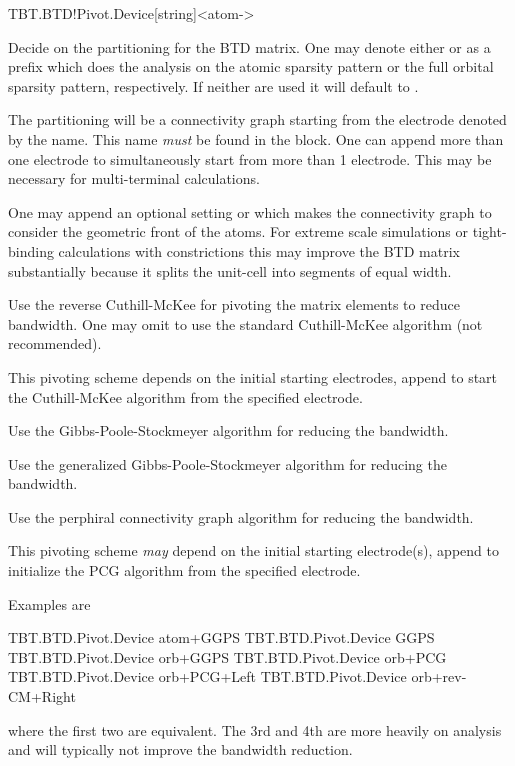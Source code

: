 \begin{fdfentry}{TBT.BTD!Pivot.Device}[string]<atom->

  Decide on the partitioning for the BTD matrix. One may denote either
   or  as a prefix which does the analysis on
  the atomic sparsity pattern or the full orbital sparsity pattern,
  respectively. If neither are used it will default to .

  \begin{fdfoptions}

    The partitioning will be a connectivity graph starting from the
    electrode denoted by the name. This name \emph{must} be found in
    the  block. One can append more than one electrode
    to simultaneously start from more than 1 electrode. This may be
    necessary for multi-terminal calculations.

    \note One may append an optional setting  or
     which makes the connectivity graph to consider the
    geometric front of the atoms. For extreme scale simulations or
    tight-binding calculations with constrictions this may improve the
    BTD matrix substantially because it splits the unit-cell into
    segments of equal width.

    \option[rev-CM] %
    Use the reverse Cuthill-McKee for pivoting the matrix elements to
    reduce bandwidth. One may omit  to use the standard
    Cuthill-McKee algorithm (not recommended).

    This pivoting scheme depends on the initial starting
    electrodes, append  to start the Cuthill-McKee
    algorithm from the specified electrode.

    \option[GPS] %
    Use the Gibbs-Poole-Stockmeyer algorithm for reducing the
    bandwidth.

    \option[GGPS] %
    Use the generalized Gibbs-Poole-Stockmeyer algorithm for reducing
    the bandwidth.

    \option[PCG] %
    Use the perphiral connectivity graph algorithm for reducing the
    bandwidth.

    This pivoting scheme \emph{may} depend on the initial starting
    electrode(s), append  to initialize the PCG
    algorithm from the specified electrode.

  \end{fdfoptions}

  Examples are
  \begin{fdfexample}
    TBT.BTD.Pivot.Device atom+GGPS
    TBT.BTD.Pivot.Device GGPS
    TBT.BTD.Pivot.Device orb+GGPS
    TBT.BTD.Pivot.Device orb+PCG
    TBT.BTD.Pivot.Device orb+PCG+Left
    TBT.BTD.Pivot.Device orb+rev-CM+Right
  \end{fdfexample}
  where the first two are equivalent. The 3rd and 4th are more heavily
  on analysis and will typically not improve the bandwidth reduction.

\end{fdfentry}

